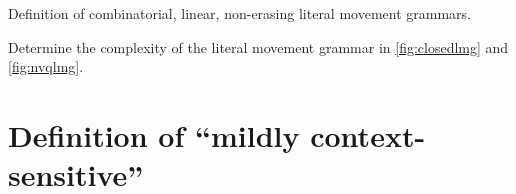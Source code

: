 \documentclass{article}
\newcommand{\pn}{\textsc{Perm NVQ}}
\begin{document}

\begin{todo}
  Definition of combinatorial, linear, non-erasing literal movement grammars.
\end{todo}
\begin{todo}
  Determine the complexity of the literal movement grammar in \autoref{fig:closedlmg} and \autoref{fig:nvqlmg}.
\end{todo}

\appendix
\section{Definition of ``mildly context-sensitive''}
\label{app:definitions}
\end{document}
